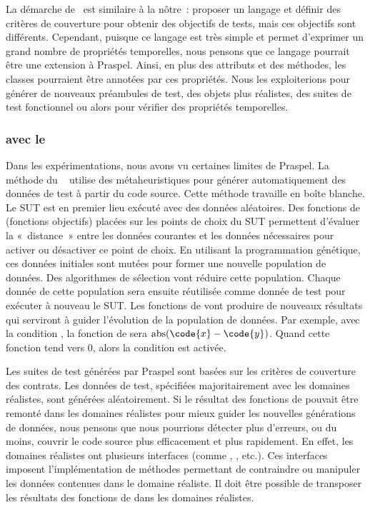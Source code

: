 La démarche de~ est similaire à la nôtre~: proposer un
langage et définir des critères de couverture pour obtenir des objectifs de
tests, mais ces objectifs sont différents. Cependant, puisque ce langage est
très simple et permet d'exprimer un grand nombre de propriétés temporelles, nous
pensons que ce langage pourrait être une extension à Praspel. Ainsi, en plus des
attributs et des méthodes, les classes pourraient être annotées par ces
propriétés. Nous les exploiterions pour générer de nouveaux préambules de test,
des objets plus réalistes, des suites de test fonctionnel ou alors pour vérifier
des propriétés temporelles.

\subsubsection{ avec le }

Dans les expérimentations, nous avons vu certaines limites de Praspel. La
méthode du ~ utilise des
métaheuristiques pour générer automatiquement des données de test à partir du
code source. Cette méthode travaille en boîte blanche. Le SUT est en premier
lieu exécuté avec des données aléatoires. Des fonctions de 
(fonctions objectifs) placées sur les points de choix du SUT permettent
d'évaluer la «~distance~» entre les données courantes et les données nécessaires
pour activer ou désactiver ce point de choix. En utilisant la programmation
génétique, ces données initiales sont mutées pour former une nouvelle population
de données. Des algorithmes de sélection vont réduire cette population. Chaque
donnée de cette population sera ensuite réutilisée comme donnée de test pour
exécuter à nouveau le SUT. Les fonctions de  vont produire de
nouveaux résultats qui serviront à guider l'évolution de la population de
données. Par exemple, avec la condition , la fonction de
 sera $\mathrm{abs}(\code{x} - \code{y})$. Quand cette
fonction tend vers 0, alors la condition est activée.

Les suites de test générées par Praspel sont basées sur les critères de
couverture des contrats. Les données de test, spécifiées majoritairement avec
les domaines réalistes, sont générées aléatoirement. Si le résultat des
fonctions de  pouvait être remonté dans les domaines
réalistes pour mieux guider les nouvelles générations de données, nous pensons
que nous pourrions détecter plus d'erreurs, ou du moins, couvrir le code source
plus efficacement et plus rapidement. En effet, les domaines réalistes ont
plusieurs interfaces (comme , , 
etc.). Ces interfaces imposent l'implémentation de méthodes permettant de
contraindre ou manipuler les données contenues dans le domaine réaliste. Il doit
être possible de transposer les résultats des fonctions de 
dans les domaines réalistes.

